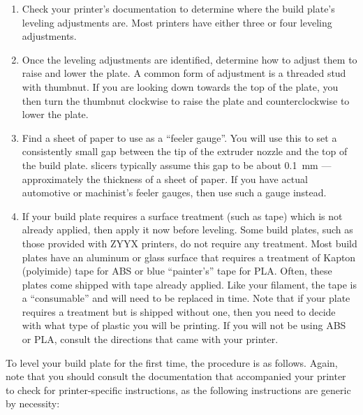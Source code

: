 \begin{enumerate}
\item Check your printer's documentation to determine where the build plate's leveling adjustments are.  Most printers have either three or four leveling adjustments.
\item Once the leveling adjustments are identified, determine how to adjust them to raise and lower the plate.  A common form of adjustment is a threaded stud with thumbnut.  If you are looking down towards the top of the plate, you then turn the thumbnut clockwise to raise the plate and counterclockwise to lower the plate.
\item Find a sheet of paper to use as a ``feeler gauge''.  You will use this to set a consistently small gap between the tip of the extruder nozzle and the top of the build plate.  \Glspl{slicer} typically assume this gap to be about 0.1~mm --- approximately the thickness of a sheet of paper.  If you have actual automotive or machinist's feeler gauges, then use such a gauge instead.
\item If your build plate requires a surface treatment (such as tape) which is not already applied, then apply it now before leveling.  Some build plates, such as those provided with ZYYX printers, do not require any treatment.  Most build plates have an aluminum or glass surface that requires a treatment of Kapton (polyimide) tape for ABS or blue ``painter's'' tape for PLA.  Often, these plates come shipped with tape already applied.  Like your filament, the tape is a ``consumable'' and will need to be replaced in time.  Note that if your plate requires a treatment but is shipped without one, then you need to decide with what type of plastic you will be printing.  If you will not be using ABS or PLA, consult the directions that came with your printer.
\end{enumerate}

To level your build plate for the first time, the procedure is as follows.  Again, note that you should consult the documentation that accompanied your printer to check for printer-specific instructions, as the following instructions are generic by necessity:

